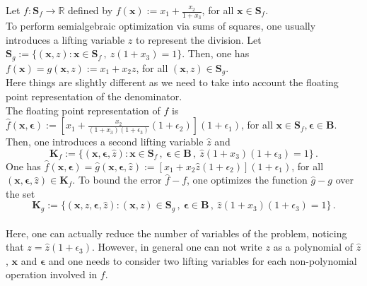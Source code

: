 \documentclass[a4paper,10pt]{article}
\newcommand{\R}{\mathbb{R}}
\newcommand{\x}{\mathbf{x}}
\newcommand{\epsilonb}{\boldsymbol{\epsilon}}
\def\S{\mathbf{S}}
\def\B{\mathbf{B}}
\def\K{\mathbf{K}}
\theoremstyle{plain}
\theoremstyle{definition}
\theoremstyle{remark}
\begin{document}
Let $f : \S_f \to \R$ defined by $f(\x) := x_1 + \frac{x_2}{1 + x_3}$, for all $\x \in \S_f$. \\
To perform semialgebraic optimization via sums of squares, one usually introduces a lifting variable  $z$ to represent the division. Let $\S_g := \{(\x,z) : \x \in \S_f\,, \ z (1 + x_3) = 1  \}$.
Then, one has $f(\x) = g(\x,z) := x_1 + x_2 z$, for all $(\x,z) \in \S_g$. \\
Here things are slightly different as we need to take into account the floating point representation of the denominator.\\
The floating point representation of $f$ is $\hat{f}(\x,\epsilonb) := [x_1 + \frac{x_2}{(1 + x_3)(1 + \epsilon_3)}(1 + \epsilon_2)](1 + \epsilon_1)$, for all $\x \in \S_f, \epsilonb \in \B$.
Then, one introduces a second lifting variable $\hat{z}$ and 
\[\K_f := \{(\x, \epsilonb, \hat{z}) : \x \in \S_f \,, \ \epsilonb \in \B \,, \ \hat{z} (1 + x_3) (1 + \epsilon_3) = 1  \} \,. \]
One has $\hat{f}(\x,\epsilonb) = \hat{g}(\x,\epsilonb,\hat{z}) := [x_1 + x_2 \hat{z}(1+\epsilon_2) ](1+\epsilon_1)$, for all $(\x, \epsilonb, \hat{z}) \in \K_f$. 
To bound the error $\hat{f} -f$, one optimizes the function $\hat{g} - g$ over the set 
\[\K_g := \{(\x, z, \epsilonb, \hat{z}) : (\x,z) \in \S_g \,, \ \epsilonb \in \B \,, \ \hat{z} (1 + x_3) (1 + \epsilon_3) = 1  \} \,. \]
\\
Here, one can actually reduce the number of variables of the problem, noticing that $z = \hat{z} (1 + \epsilon_3)$. However, in general one can not write $z$ as a polynomial of $\hat{z}$, $\x$ and $\epsilonb$ and one needs to consider two lifting variables for each non-polynomial operation involved in $f$.
%
\end{document}
